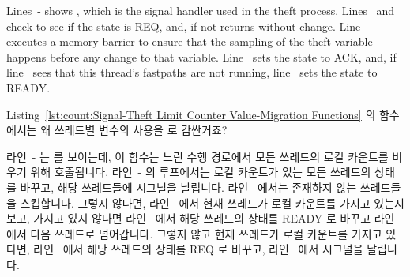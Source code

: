 \begin{lineref}
\begin{lineref}
Lines~- shows ,
which is the signal
handler used in the theft process.
Lines~ and~ check to see if
the  state is REQ, and, if not
returns without change.
Line~ executes a memory barrier to ensure that the sampling of the
theft variable happens before any change to that variable.
Line~ sets the  state to ACK, and, if
line~ sees that
this thread's fastpaths are not running, line~ sets the 
state to READY.
\fi
\end{lineref}

\QuickQuiz{}
	Listing~\ref{lst:count:Signal-Theft Limit Counter Value-Migration Functions}
	의  함수에서는 왜  쓰레드별
	변수의 사용을  로 감싼거죠?

{} \QuickQuizEnd

\begin{lineref}
라인~- 는  를 보이는데, 이 함수는
느린 수행 경로에서 모든 쓰레드의 로컬 카운트를 비우기 위해 호출됩니다.
라인~- 의 루프에서는 로컬 카운트가 있는 모든
쓰레드의  상태를 바꾸고, 해당 쓰레드들에 시그널을 날립니다.
라인~ 에서는 존재하지 않는 쓰레드들을 스킵합니다.
그렇지 않다면, 라인~ 에서 현재 쓰레드가 로컬 카운트를 가지고
있는지 보고, 가지고 있지 않다면 라인~ 에서 해당 쓰레드의
 상태를 READY 로 바꾸고 라인~ 에서 다음 쓰레드로
넘어갑니다.
그렇지 않고 현재 쓰레드가 로컬 카운트를 가지고 있다면, 라인~ 에서
해당 쓰레드의  상태를 REQ 로 바꾸고, 라인~ 에서
시그널을 날립니다.
\iffalse


\end{lineref}
\end{lineref}
